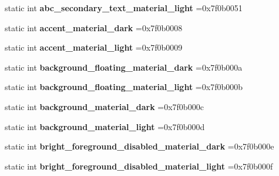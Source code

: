 \begin{DoxyCompactItemize}
static int {\bfseries abc\+\_\+secondary\+\_\+text\+\_\+material\+\_\+light} =0x7f0b0051
\item 
\mbox{\label{classandroid_1_1support_1_1design_1_1R_1_1color_aa5b6a61244015500913378eab22d660b}} 
static int {\bfseries accent\+\_\+material\+\_\+dark} =0x7f0b0008
\item 
\mbox{\label{classandroid_1_1support_1_1design_1_1R_1_1color_ae6c87a853af80c7fc287d77e0caaa024}} 
static int {\bfseries accent\+\_\+material\+\_\+light} =0x7f0b0009
\item 
\mbox{\label{classandroid_1_1support_1_1design_1_1R_1_1color_a60601c211c07e608e5f7981839144047}} 
static int {\bfseries background\+\_\+floating\+\_\+material\+\_\+dark} =0x7f0b000a
\item 
\mbox{\label{classandroid_1_1support_1_1design_1_1R_1_1color_a7ddb3d7f6c2a186978990f775ceceb9e}} 
static int {\bfseries background\+\_\+floating\+\_\+material\+\_\+light} =0x7f0b000b
\item 
\mbox{\label{classandroid_1_1support_1_1design_1_1R_1_1color_a3dfad200cafda41872b9941c14091e92}} 
static int {\bfseries background\+\_\+material\+\_\+dark} =0x7f0b000c
\item 
\mbox{\label{classandroid_1_1support_1_1design_1_1R_1_1color_a45d03351dbd52d95c82143eb1f3061bf}} 
static int {\bfseries background\+\_\+material\+\_\+light} =0x7f0b000d
\item 
\mbox{\label{classandroid_1_1support_1_1design_1_1R_1_1color_a12f7f22ffb317b2dd393e146d7ed0c6d}} 
static int {\bfseries bright\+\_\+foreground\+\_\+disabled\+\_\+material\+\_\+dark} =0x7f0b000e
\item 
\mbox{\label{classandroid_1_1support_1_1design_1_1R_1_1color_a6a2c3e11250be0be9454c67662d7fdf5}} 
static int {\bfseries bright\+\_\+foreground\+\_\+disabled\+\_\+material\+\_\+light} =0x7f0b000f

\end{DoxyCompactItemize}

